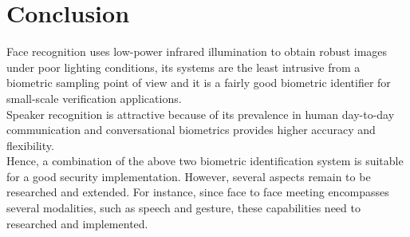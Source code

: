\chapter{Conclusion}

Face recognition uses low-power infrared illumination to obtain robust images under poor lighting conditions, its systems are the least intrusive from a biometric sampling point of view and it is a fairly good biometric identifier for small-scale verification applications. \\
Speaker recognition is attractive because of its prevalence in human day-to-day communication and conversational biometrics provides higher accuracy and flexibility. \\
Hence, a combination of the above two biometric identification system is suitable for a good security implementation. 
However, several aspects remain to be researched and extended.
For instance, since face to face meeting encompasses several modalities, such as
speech and gesture, these capabilities need to researched and implemented. \\
